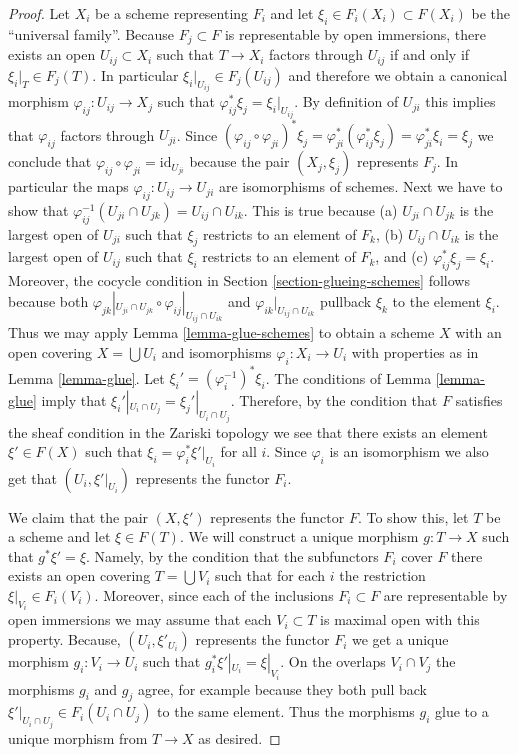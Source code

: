 \begin{proof}
Let $X_i$ be a scheme representing $F_i$ and let
$\xi_i \in F_i(X_i) \subset F(X_i)$ be the ``universal family''.
Because $F_j \subset F$ is representable by open immersions,
there exists an open $U_{ij} \subset X_i$ such that
$T \to X_i$ factors through $U_{ij}$ if and only if
$\xi_i|_T \in F_j(T)$. In particular
$\xi_i|_{U_{ij}} \in F_j(U_{ij})$ and therefore we obtain a
canonical morphism $\varphi_{ij} : U_{ij} \to X_j$ such that
$\varphi_{ij}^*\xi_j = \xi_i|_{U_{ij}}$. By definition of $U_{ji}$
this implies that $\varphi_{ij}$ factors through $U_{ji}$.
Since $(\varphi_{ij} \circ \varphi_{ji})^*\xi_j
=\varphi_{ji}^*(\varphi_{ij}^*\xi_j) =
\varphi_{ji}^*\xi_i = \xi_j$ we conclude that
$\varphi_{ij} \circ \varphi_{ji} = \text{id}_{U_{ji}}$
because the pair $(X_j, \xi_j)$ represents $F_j$.
In particular the maps $\varphi_{ij} : U_{ij} \to U_{ji}$
are isomorphisms of schemes.
Next we have to show that
$\varphi_{ij}^{-1}(U_{ji} \cap U_{jk}) = U_{ij} \cap U_{ik}$.
This is true because (a) $U_{ji} \cap U_{jk}$ is the largest
open of $U_{ji}$ such that $\xi_j$ restricts to an element
of $F_k$, (b) $U_{ij} \cap U_{ik}$ is the largest
open of $U_{ij}$ such that $\xi_i$ restricts to an element
of $F_k$, and (c) $\varphi_{ij}^*\xi_j = \xi_i$. Moreover,
the cocycle condition in Section \ref{section-glueing-schemes}
follows because both
$\varphi_{jk}|_{U_{ji} \cap U_{jk}} \circ
\varphi_{ij}|_{U_{ij} \cap U_{ik}}$ and
$\varphi_{ik}|_{U_{ij} \cap U_{ik}}$ pullback $\xi_k$
to the element $\xi_i$.
Thus we may apply Lemma \ref{lemma-glue-schemes}
to obtain a scheme $X$ with an open
covering $X = \bigcup U_i$ and isomorphisms $\varphi_i : X_i \to U_i$
with properties as in Lemma \ref{lemma-glue}.
Let $\xi_i' = (\varphi_i^{-1})^* \xi_i$.
The conditions of Lemma \ref{lemma-glue} imply that
$\xi_i'|_{U_i \cap U_j} = \xi_j'|_{U_i \cap U_j}$.
Therefore, by the condition that $F$ satisfies the sheaf
condition in the Zariski topology we see that
there exists an element $\xi' \in F(X)$ such that
$\xi_i = \varphi_i^*\xi'|_{U_i}$ for all $i$.
Since $\varphi_i$ is an isomorphism we also get that
$(U_i, \xi'|_{U_i})$ represents the functor $F_i$.

\medskip\noindent
We claim that the pair $(X, \xi')$ represents the functor $F$.
To show this, let $T$ be a scheme and let $\xi \in F(T)$.
We will construct a unique morphism $g : T \to X$ such that
$g^*\xi' = \xi$. Namely, by the condition that the subfunctors
$F_i$ cover $F$ there exists an open covering $T = \bigcup V_i$
such that for each $i$ the restriction $\xi|_{V_i} \in F_i(V_i)$.
Moreover, since each of the inclusions $F_i \subset F$ are representable
by open immersions we may assume that each $V_i \subset T$ is maximal
open with this property.
Because, $(U_i, \xi'_{U_i})$ represents the functor $F_i$ we
get a unique morphism $g_i : V_i \to U_i$ such that
$g_i^*\xi'|_{U_i} = \xi|_{V_i}$. On the overlaps $V_i \cap V_j$
the morphisms $g_i$ and $g_j$ agree, for example because they both
pull back $\xi'|_{U_i \cap U_j} \in F_i(U_i \cap U_j)$
to the same element. Thus the morphisms $g_i$ glue to a unique morphism
from $T \to X$ as desired.
\end{proof}

